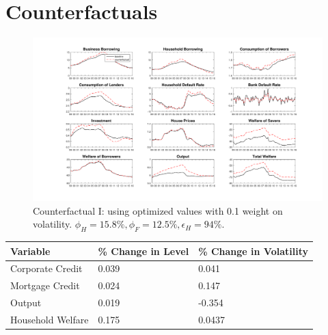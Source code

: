 \documentclass[12pt]{article}
\numberwithin{equation}{section}
\begin{document}



\newpage

\section*{Counterfactuals}


\begin{figure}[H]
\centering
\caption{Counterfactual I: using optimized values  with 0.1 weight on volatility. $\phi_H=15.8 \%, \phi_F=12.5 \%, \epsilon_H=94 \%$.}
\label{counterfact1_figure}
\includegraphics[scale=0.45]{counterfactuals2.pdf}
\end{figure}

\begin{table}[h]
\label{couterfac1_table}
\begin{tabular}{l|l|l}
Variable & \% Change in Level & \% Change in Volatility \\
\hline
\hline
    Corporate Credit           &       0.039    &      0.041 \\
    Mortgage Credit            &      0.024    &       0.147 \\
    Output         &     0.019    &    -0.354 \\ 
    Household Welfare       &     0.175     &     0.0437\\
\end{tabular}
\end{table}
\end{document}
